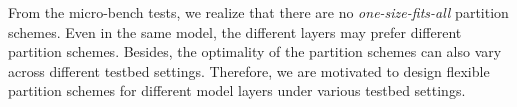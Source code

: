 From the micro-bench tests, we realize that there are no \emph{one-size-fits-all} partition schemes. Even in the same model, the different layers may prefer different partition schemes. Besides, the optimality of the partition schemes can also vary across different testbed settings. Therefore, we are motivated to design flexible partition schemes for different model layers under various testbed settings.  







